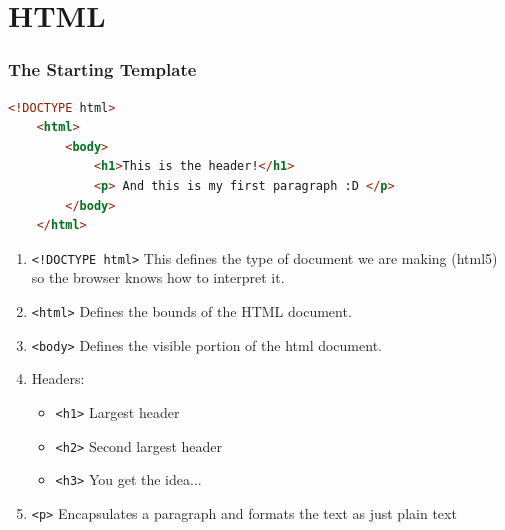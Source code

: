\documentclass{beamer}
\begin{document}
\section{HTML}
%
%
\begin{frame}[fragile]
    \frametitle{The Starting Template}
    \begin{lstlisting}[language=html,autogobble]
    <!DOCTYPE html>
    <html>
        <body>
            <h1>This is the header!</h1>
            <p> And this is my first paragraph :D </p>
        </body>
    </html>
    \end{lstlisting} 
    \vfill
    \begin{enumerate}
        \item \lstinline|<!DOCTYPE html>| \textrightarrow This defines the type of document we are making (html5) so the browser knows how to interpret it.
        \item \lstinline|<html>| \textrightarrow Defines the bounds of the HTML document.
        \item \lstinline|<body>| \textrightarrow Defines the visible portion of the html document.
        \item Headers:
            \begin{itemize}
                \item \lstinline|<h1>| \textrightarrow Largest header
                \item \lstinline|<h2>| \textrightarrow Second largest header
                \item \lstinline|<h3>| \textrightarrow You get the idea...
            \end{itemize}
        \item \lstinline|<p>| \textrightarrow Encapsulates a paragraph and formats the text as just plain text
    \end{enumerate}
\end{frame}
\end{document}
